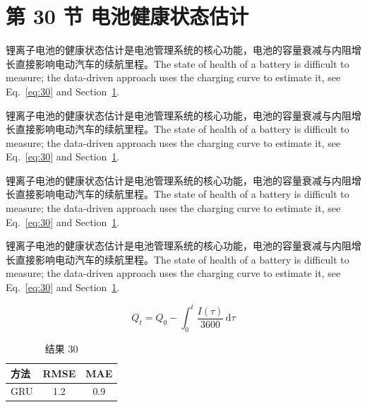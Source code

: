 \documentclass[UTF8,fontset=mac]{ctexart}
\begin{document}
\section{第 30 节 电池健康状态估计}\label{sec:30}
锂离子电池的健康状态估计是电池管理系统的核心功能，电池的容量衰减与内阻增长直接影响电动汽车的续航里程\cite{a2020}。The state of health of a battery is difficult to measure; the data-driven approach uses the charging curve to estimate it, see Eq.~\eqref{eq:30} and Section~\ref{sec:30}.

锂离子电池的健康状态估计是电池管理系统的核心功能，电池的容量衰减与内阻增长直接影响电动汽车的续航里程\cite{a2020}。The state of health of a battery is difficult to measure; the data-driven approach uses the charging curve to estimate it, see Eq.~\eqref{eq:30} and Section~\ref{sec:30}.

锂离子电池的健康状态估计是电池管理系统的核心功能，电池的容量衰减与内阻增长直接影响电动汽车的续航里程\cite{a2020}。The state of health of a battery is difficult to measure; the data-driven approach uses the charging curve to estimate it, see Eq.~\eqref{eq:30} and Section~\ref{sec:30}.

锂离子电池的健康状态估计是电池管理系统的核心功能，电池的容量衰减与内阻增长直接影响电动汽车的续航里程\cite{a2020}。The state of health of a battery is difficult to measure; the data-driven approach uses the charging curve to estimate it, see Eq.~\eqref{eq:30} and Section~\ref{sec:30}.

\begin{equation}\label{eq:30}
  Q_t = Q_0 - \int_0^t \frac{I(\tau)}{3600}\,\mathrm{d}\tau
\end{equation}
\begin{table}[h]\centering\begin{tabular}{lcc}\toprule 方法 & RMSE & MAE\\\midrule GRU & 1.2 & 0.9\\\bottomrule\end{tabular}\caption{结果 30}\end{table}



\end{document}
